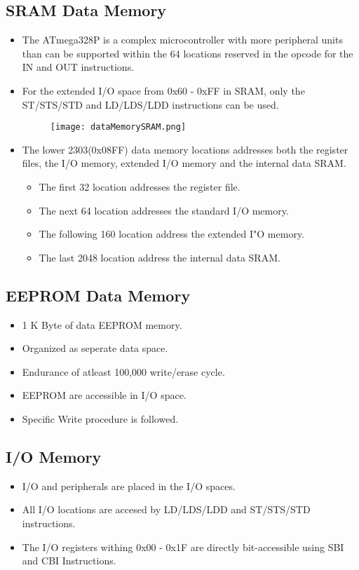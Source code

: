 \subsection{SRAM Data Memory}
\begin{itemize}
    \item The ATmega328P is a complex microcontroller with more peripheral units than can be supported within the 64 locations reserved in the opcode for the IN and OUT instructions.
    \item For the extended I/O space from 0x60 - 0xFF in SRAM, only the ST/STS/STD and LD/LDS/LDD instructions can be used.
    \begin{figure}[H]
        \begin{center}
            \texttt{[image: dataMemorySRAM.png]}
        \end{center}
    \end{figure}
    \item The lower 2303(0x08FF) data memory locations addresses both the register files, the I/O memory, extended I/O memory and the internal data SRAM.
    \begin{itemize}
        \item The first 32 location addresses the register file.
        \item The next 64 location addresses the standard I/O memory.
        \item The following 160 location address the extended I"O memory.
        \item The last 2048 location address the internal data SRAM.
    \end{itemize}
\end{itemize}

\subsection{EEPROM Data Memory}
\begin{itemize}
    \item 1 K Byte of data EEPROM memory.
    \item Organized as seperate data space.
    \item Endurance of atleast 100,000 write/erase cycle.
    \item EEPROM are accessible in I/O space.
    \item Specific Write procedure is followed. 
\end{itemize}

\subsection{I/O Memory}
\begin{itemize}
    \item I/O and peripherals are placed in the I/O spaces.
    \item All I/O locations are accesed by LD/LDS/LDD and ST/STS/STD instructions.
    \item The I/O registers withing 0x00 - 0x1F are directly bit-accessible using SBI and CBI Instructions.
\end{itemize}


